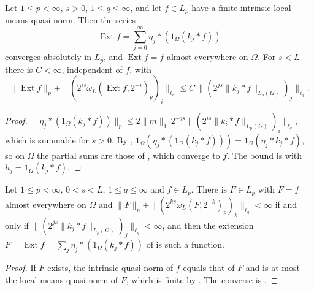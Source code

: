 \begin{theorem}
\label{thm:graph-extension}
\leanok
{}
Let $1 \leq p < \infty$, $s > 0$, $1 \leq q \leq \infty$, and let $f \in L_p$ have a finite
intrinsic local means quasi-norm. Then the series
\[
  \operatorname{Ext} f = \sum_{j=0}^\infty \eta_j * (1_\Omega (k_j * f))
\]
converges absolutely in $L_p$, and $\operatorname{Ext} f = f$ almost everywhere on $\Omega$. For
$s < L$ there is $C < \infty$, independent of $f$, with
\[
  \|\operatorname{Ext} f\|_p + \|(2^{is} \omega_L(\operatorname{Ext} f, 2^{-i})_p)_i\|_{\ell_q}
  \leq C \, \|(2^{js} \|k_j * f\|_{L_p(\Omega)})_j\|_{\ell_q} .
\]
\end{theorem}

\begin{proof}
\leanok
$\|\eta_j * (1_\Omega (k_j * f))\|_p \leq 2 \|m\|_1 \, 2^{-js}
\|(2^{is} \|k_i * f\|_{L_p(\Omega)})_i\|_{\ell_q}$, which is summable for $s > 0$. By
,
$1_\Omega (\eta_j * (1_\Omega (k_j * f))) = 1_\Omega (\eta_j * k_j * f)$, so on $\Omega$ the
partial sums are those of , which converge to $f$. The bound is
 with $h_j = 1_\Omega (k_j * f)$.
\end{proof}

\begin{theorem}
\label{thm:restriction-local-means}
\leanok
{}
Let $1 \leq p < \infty$, $0 < s < L$, $1 \leq q \leq \infty$ and $f \in L_p$. There is
$F \in L_p$ with $F = f$ almost everywhere on $\Omega$ and
$\|F\|_p + \|(2^{ks} \omega_L(F, 2^{-k})_p)_k\|_{\ell_q} < \infty$ if and only if
$\|(2^{js} \|k_j * f\|_{L_p(\Omega)})_j\|_{\ell_q} < \infty$, and then the extension
$F = \operatorname{Ext} f = \sum_j \eta_j * (1_\Omega (k_j * f))$ of 
is such a function.
\end{theorem}

\begin{proof}
\leanok
If $F$ exists, the intrinsic quasi-norm of $f$ equals that of $F$ and is at most the local means
quasi-norm of $F$, which is finite by . The converse is
.
\end{proof}

